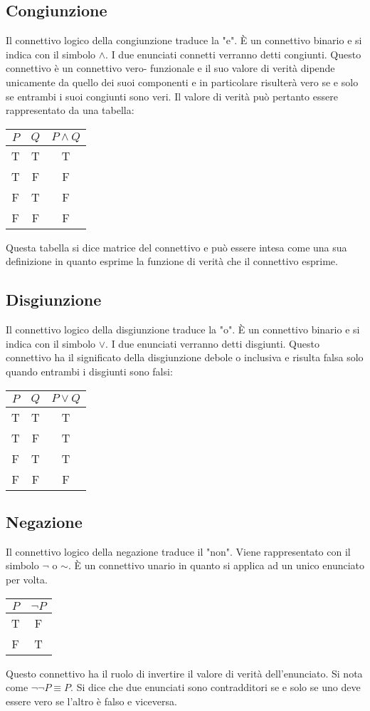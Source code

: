 \subsection{Congiunzione}
Il connettivo logico della congiunzione traduce la "e". \`E un connettivo binario e si indica con il simbolo $\land$. I due enunciati connetti verranno detti congiunti. Questo connettivo \`e un connettivo vero-
funzionale e il suo valore di verit\`a dipende unicamente da quello dei suoi componenti e in particolare risulter\`a vero se e solo se entrambi i suoi congiunti sono veri. Il valore di verit\`a pu\`o pertanto essere 
rappresentato da una tabella:
\begin{tabular}{|c|c|c|}
\hline
$P$ & $Q$ & $P\land Q$\\
\hline
T & T & T \\
\hline
T & F & F \\
\hline
F & T & F \\
\hline
F & F & F \\
\hline
\end{tabular}
Questa tabella si dice matrice del connettivo e pu\`o essere intesa come una sua definizione in quanto esprime la funzione di verit\`a che il connettivo esprime. 
\subsection{Disgiunzione}
Il connettivo logico della disgiunzione traduce la "o". \`E un connettivo binario e si indica con il simbolo $\lor$. I due enunciati verranno detti disgiunti. Questo connettivo ha il significato della disgiunzione 
debole o inclusiva e risulta falsa solo quando entrambi i disgiunti sono falsi:
\begin{tabular}{|c|c|c|}
\hline
$P$ & $Q$ & $P\lor Q$\\
\hline
T & T & T \\
\hline
T & F & T \\
\hline
F & T & T \\
\hline
F & F & F \\
\hline
\end{tabular}
\subsection{Negazione}
Il connettivo logico della negazione traduce il "non". Viene rappresentato con il simbolo $\neg$ o $\sim$. \`E un connettivo unario in quanto si applica ad un unico enunciato per volta. 
\begin{tabular}{|c|c|}
\hline
$P$ & $\neg P$ \\
\hline
T & F \\
\hline
F & T \\
\hline
\end{tabular}
Questo connettivo ha il ruolo di invertire il valore di verit\`a dell'enunciato. Si nota come $\neg\neg P\equiv P$. Si dice che due enunciati sono contradditori se e solo se uno deve essere vero se l'altro \`e falso e 
viceversa. 
